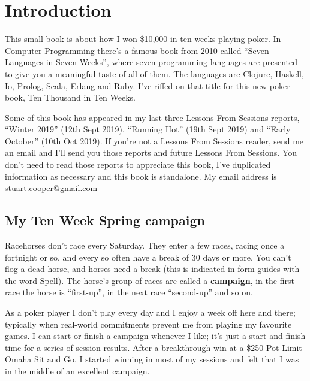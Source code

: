 \chapter{Introduction}



This small book is about how I won \$10,000 in ten weeks playing
poker. In Computer Programming there's a famous book from
2010 called ``Seven Languages in Seven Weeks'', where seven
programming languages are presented to give you a meaningful taste of
all of them. The languages are Clojure, Haskell, Io, Prolog, Scala,
Erlang and Ruby. I've riffed on that title for this new
poker book, Ten Thousand in Ten Weeks.

Some of this book has appeared in my last three Lessons From Sessions
reports, ``Winter 2019'' (12th Sept 2019), ``Running Hot'' (19th Sept
2019) and ``Early October'' (10th Oct 2019). If you're not a Lessons
From Sessions reader, send me an email and I'll send you those reports
and future Lessons From Sessions. You don't need to read those reports
to appreciate this book, I've duplicated information as necessary and
this book is standalone. My email address is stuart.cooper@gmail.com

\section*{My Ten Week Spring campaign}

Racehorses don't race every Saturday. They enter a few races, racing
once a fortnight or so, and every so often have a break of 30 days or
more. You can't flog a dead horse, and horses need a break (this is
indicated in form guides with the word Spell). The horse's group of
races are called a \textbf{campaign}, in the first race the horse is
``first-up'', in the next race ``second-up'' and so on.

As a poker player I don't play every day and I enjoy a week off here
and there; typically when real-world commitments prevent me from
playing my favourite games. I can start or finish a campaign whenever
I like; it's just a start and finish time for a series of session
results. After a breakthrough win at a \$250 Pot Limit Omaha Sit and
Go, I started winning in most of my sessions and felt that I was in
the middle of an excellent campaign.

